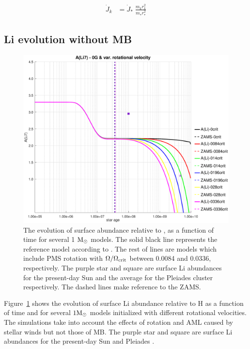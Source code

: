 \documentclass[fleqn,usenatbib]{mnras}
\begin{document}
{{\begin{ceqn}
\begin{align}
    \Dot{J}_{k} &= \Dot{J}_*\;\frac{m^{}_{k} r^2_{k}}{m^{}_* r_*^2} \label{eq:k_jdot}
\end{align}
\end{ceqn}


\subsection{Li evolution without MB}

\begin{figure}
	\includegraphics[trim = 35mm 15mm 20mm 15mm, clip, width=\columnwidth]{figures/li_var_vel_0_0g.eps}
    \caption{The evolution of surface  abundance relative to , as a function of time for several 1 $\mathrm{M}_\odot$ models. The solid black line represents the reference model according to \citet{Choi2016}. The rest of lines are models which include PMS rotation with $\Omega / \Omega_{\mathrm{crit}}$ between 0.0084 and 0.0336, respectively. The purple star and square are surface Li abundances for the present-day Sun \citep{Asplund2009} and the average for the Pleiades cluster \citep{Sestito2005} respectively. The dashed lines make reference to the ZAMS.}
    \label{fig:li_var_vel_0g}
\end{figure}

Figure~\ref{fig:li_var_vel_0g} shows the evolution of surface Li abundance relative to H as a function of time and for several $1\mathrm{M}_\odot$ models initialized with different rotational velocities. The simulations take into account the effects of rotation and AML caused by stellar winds but not those of MB. The purple star and square are surface Li abundances for the present-day Sun \citep{Asplund2009} and Pleiades \citep{Sestito2005}.\par

}}
\end{document}
